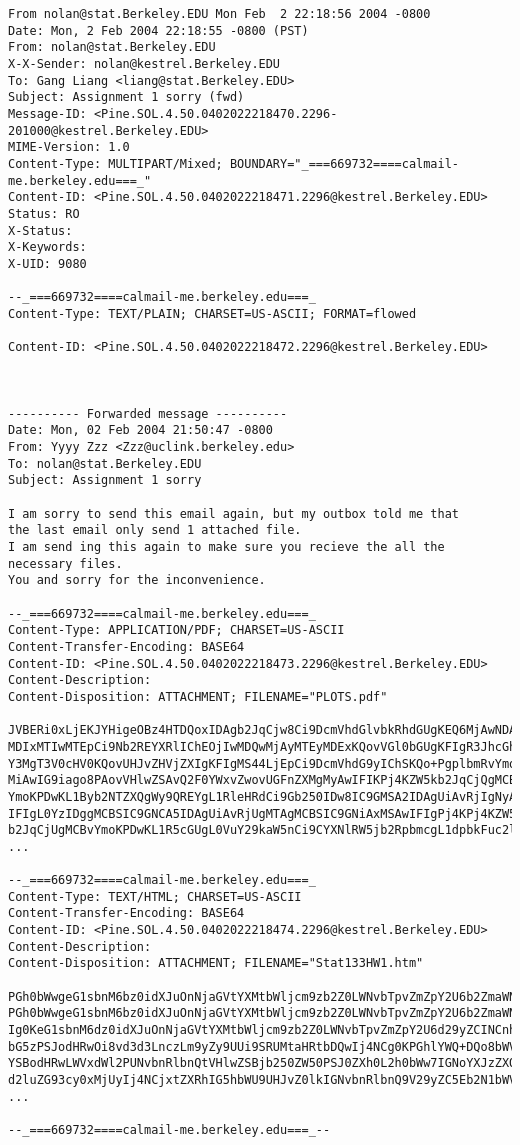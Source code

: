 \begin{verbatim}
From nolan@stat.Berkeley.EDU Mon Feb  2 22:18:56 2004 -0800
Date: Mon, 2 Feb 2004 22:18:55 -0800 (PST)
From: nolan@stat.Berkeley.EDU
X-X-Sender: nolan@kestrel.Berkeley.EDU
To: Gang Liang <liang@stat.Berkeley.EDU>
Subject: Assignment 1 sorry (fwd)
Message-ID: <Pine.SOL.4.50.0402022218470.2296-201000@kestrel.Berkeley.EDU>
MIME-Version: 1.0
Content-Type: MULTIPART/Mixed; BOUNDARY="_===669732====calmail-me.berkeley.edu===_"
Content-ID: <Pine.SOL.4.50.0402022218471.2296@kestrel.Berkeley.EDU>
Status: RO
X-Status:
X-Keywords:
X-UID: 9080
 
--_===669732====calmail-me.berkeley.edu===_
Content-Type: TEXT/PLAIN; CHARSET=US-ASCII; FORMAT=flowed
 
Content-ID: <Pine.SOL.4.50.0402022218472.2296@kestrel.Berkeley.EDU>
 
 
   
---------- Forwarded message ----------
Date: Mon, 02 Feb 2004 21:50:47 -0800
From: Yyyy Zzz <Zzz@uclink.berkeley.edu>
To: nolan@stat.Berkeley.EDU
Subject: Assignment 1 sorry
 
I am sorry to send this email again, but my outbox told me that 
the last email only send 1 attached file. 
I am send ing this again to make sure you recieve the all the necessary files.
You and sorry for the inconvenience.
  
--_===669732====calmail-me.berkeley.edu===_
Content-Type: APPLICATION/PDF; CHARSET=US-ASCII
Content-Transfer-Encoding: BASE64
Content-ID: <Pine.SOL.4.50.0402022218473.2296@kestrel.Berkeley.EDU>
Content-Description:
Content-Disposition: ATTACHMENT; FILENAME="PLOTS.pdf"
 
JVBERi0xLjEKJYHigeOBz4HTDQoxIDAgb2JqCjw8Ci9DcmVhdGlvbkRhdGUgKEQ6MjAwNDAy
MDIxMTIwMTEpCi9Nb2REYXRlIChEOjIwMDQwMjAyMTEyMDExKQovVGl0bGUgKFIgR3JhcGhp
Y3MgT3V0cHV0KQovUHJvZHVjZXIgKFIgMS44LjEpCi9DcmVhdG9yIChSKQo+PgplbmRvYmoK
MiAwIG9iago8PAovVHlwZSAvQ2F0YWxvZwovUGFnZXMgMyAwIFIKPj4KZW5kb2JqCjQgMCBv
YmoKPDwKL1Byb2NTZXQgWy9QREYgL1RleHRdCi9Gb250IDw8IC9GMSA2IDAgUiAvRjIgNyAw
IFIgL0YzIDggMCBSIC9GNCA5IDAgUiAvRjUgMTAgMCBSIC9GNiAxMSAwIFIgPj4KPj4KZW5k
b2JqCjUgMCBvYmoKPDwKL1R5cGUgL0VuY29kaW5nCi9CYXNlRW5jb2RpbmcgL1dpbkFuc2lF
...
 
--_===669732====calmail-me.berkeley.edu===_
Content-Type: TEXT/HTML; CHARSET=US-ASCII
Content-Transfer-Encoding: BASE64
Content-ID: <Pine.SOL.4.50.0402022218474.2296@kestrel.Berkeley.EDU>
Content-Description:
Content-Disposition: ATTACHMENT; FILENAME="Stat133HW1.htm"
  
PGh0bWwgeG1sbnM6bz0idXJuOnNjaGVtYXMtbWljcm9zb2Z0LWNvbTpvZmZpY2U6b2ZmaWNl^M
PGh0bWwgeG1sbnM6bz0idXJuOnNjaGVtYXMtbWljcm9zb2Z0LWNvbTpvZmZpY2U6b2ZmaWNl^M
Ig0KeG1sbnM6dz0idXJuOnNjaGVtYXMtbWljcm9zb2Z0LWNvbTpvZmZpY2U6d29yZCINCnht^M
bG5zPSJodHRwOi8vd3d3LnczLm9yZy9UUi9SRUMtaHRtbDQwIj4NCg0KPGhlYWQ+DQo8bWV0^M
YSBodHRwLWVxdWl2PUNvbnRlbnQtVHlwZSBjb250ZW50PSJ0ZXh0L2h0bWw7IGNoYXJzZXQ9^M
d2luZG93cy0xMjUyIj4NCjxtZXRhIG5hbWU9UHJvZ0lkIGNvbnRlbnQ9V29yZC5Eb2N1bWVu^M
...

--_===669732====calmail-me.berkeley.edu===_--
    
\end{verbatim}


